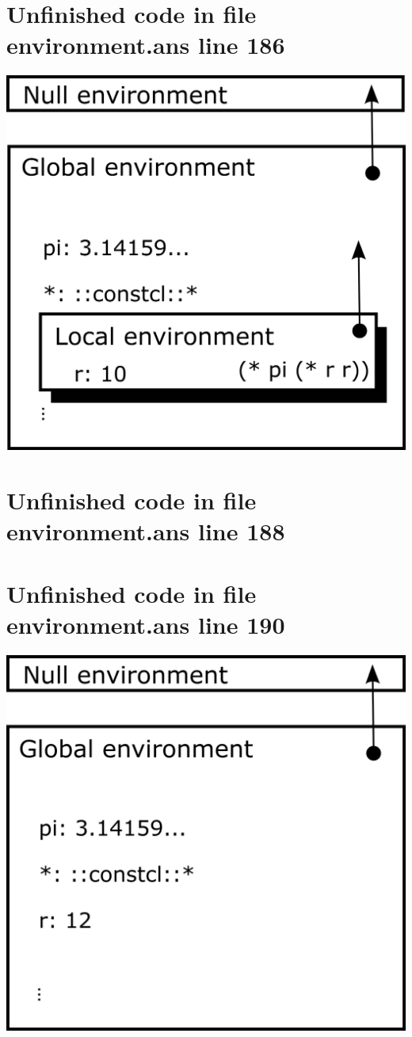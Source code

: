 \documentclass[twoside,9pt]{report}
\begin{document}
\section{Unfinished code in file environment.ans line 186}
\includegraphics{images/env2.png}
\section{Unfinished code in file environment.ans line 188}
\section{Unfinished code in file environment.ans line 190}
\includegraphics{images/env1.png}
\end{document}
